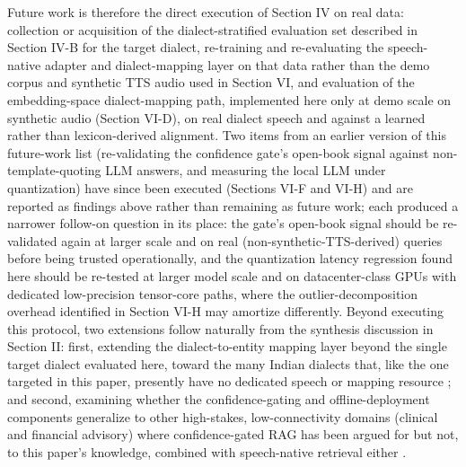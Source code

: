 \documentclass[conference]{IEEEtran}
\begin{document}
Future work is therefore the direct execution of Section IV on real data: collection or acquisition of the dialect-stratified evaluation set described in Section IV-B for the target dialect, re-training and re-evaluating the speech-native adapter and dialect-mapping layer on that data rather than the demo corpus and synthetic TTS audio used in Section VI, and evaluation of the embedding-space dialect-mapping path, implemented here only at demo scale on synthetic audio (Section VI-D), on real dialect speech and against a learned rather than lexicon-derived alignment. Two items from an earlier version of this future-work list (re-validating the confidence gate's open-book signal against non-template-quoting LLM answers, and measuring the local LLM under quantization) have since been executed (Sections VI-F and VI-H) and are reported as findings above rather than remaining as future work; each produced a narrower follow-on question in its place: the gate's open-book signal should be re-validated again at larger scale and on real (non-synthetic-TTS-derived) queries before being trusted operationally, and the quantization latency regression found here should be re-tested at larger model scale and on datacenter-class GPUs with dedicated low-precision tensor-core paths, where the outlier-decomposition overhead identified in Section VI-H may amortize differently. Beyond executing this protocol, two extensions follow naturally from the synthesis discussion in Section II: first, extending the dialect-to-entity mapping layer beyond the single target dialect evaluated here, toward the many Indian dialects that, like the one targeted in this paper, presently have no dedicated speech or mapping resource \cite{dialectmatters2026,singh2023respin}; and second, examining whether the confidence-gating and offline-deployment components generalize to other high-stakes, low-connectivity domains (clinical and financial advisory) where confidence-gated RAG has been argued for but not, to this paper's knowledge, combined with speech-native retrieval either \cite{dependablerag2026,abstinence2025}.




\end{document}
